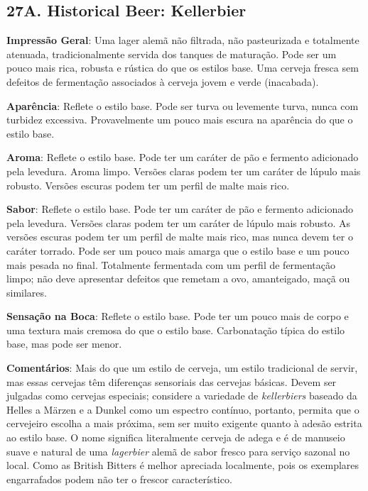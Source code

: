 \subsection*{27A. Historical Beer: Kellerbier}

\textbf{Impressão Geral}: Uma lager alemã não filtrada, não pasteurizada e totalmente atenuada, tradicionalmente servida dos tanques de maturação. Pode ser um pouco mais rica, robusta e rústica do que os estilos base. Uma cerveja fresca sem defeitos de fermentação associados à cerveja jovem e verde (inacabada).

\textbf{Aparência}: Reflete o estilo base. Pode ser turva ou levemente turva, nunca com turbidez excessiva. Provavelmente um pouco mais escura na aparência do que o estilo base.

\textbf{Aroma}: Reflete o estilo base. Pode ter um caráter de pão e fermento adicionado pela levedura. Aroma limpo. Versões claras podem ter um caráter de lúpulo mais robusto. Versões escuras podem ter um perfil de malte mais rico.

\textbf{Sabor}: Reflete o estilo base. Pode ter um caráter de pão e fermento adicionado pela levedura. Versões claras podem ter um caráter de lúpulo mais robusto. As versões escuras podem ter um perfil de malte mais rico, mas nunca devem ter o caráter torrado. Pode ser um pouco mais amarga que o estilo base e um pouco mais pesada no final. Totalmente fermentada com um perfil de fermentação limpo; não deve apresentar defeitos que remetam a ovo, amanteigado, maçã ou similares.

\textbf{Sensação na Boca}: Reflete o estilo base. Pode ter um pouco mais de corpo e uma textura mais cremosa do que o estilo base. Carbonatação típica do estilo base, mas pode ser menor.

\textbf{Comentários}: Mais do que um estilo de cerveja, um estilo tradicional de servir, mas essas cervejas têm diferenças sensoriais das cervejas básicas. Devem ser julgadas como cervejas especiais; considere a variedade de \textit{kellerbiers} baseado da Helles a Märzen e a Dunkel como um espectro contínuo, portanto, permita que o cervejeiro escolha a mais próxima, sem ser muito exigente quanto à adesão estrita ao estilo base. O nome significa literalmente cerveja de adega e é de manuseio suave e natural de uma \textit{lagerbier} alemã de sabor fresco para serviço sazonal no local. Como as British Bitters é melhor apreciada localmente, pois os exemplares engarrafados podem não ter o frescor característico.

